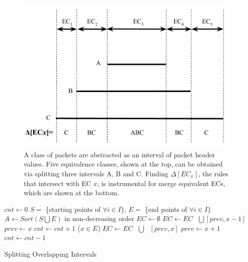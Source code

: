 \begin{figure}[t]
\centering
\includegraphics[scale=.52]{figures/DisjointECs.pdf}
\caption{A class of packets are abstracted as an interval of packet header values.
        Five equivalence classes, shown at the top, can be obtained via splitting three intervals A, B and C.
        Finding $\Delta[EC_x]$, the rules that intersect with EC $x$, is instrumental for
        merge equivalent ECs, which are shown at the bottom.}
\label{Fig:DisjointECsAsInterval}
\end{figure}

\begin{algorithm}[t]
\DontPrintSemicolon
{}
$cnt \gets 0$\;
$S = $ \{starting points of $\forall i \in I\}$, $E = $ \{end points of $\forall i \in I\}$\;
$A \gets Sort(S \bigcup E)$ in non-decreasing order\;
$EC \gets \emptyset$\;
 {
         {
                 {\label{Alg:LineEndStart1} 
                        $EC \gets EC \text{ }\bigcup \text{} [prev, x-1]$\;
                }\label{Alg:LineEndStart2} 
                $prev \gets x$\;\label{Alg:LineNewPrev1}
                $cnt \gets cnt + 1$\;
        }
        \Else ($x \in E$) {
                $EC \gets EC \text{ } \bigcup \text{ } [prev, x]$\;\label{Alg:LineEndEnd}
                $prev \gets x + 1$\;\label{Alg:LineNewPrev2}
                $cnt \gets cnt - 1$\;
        }
}
\caption{Splitting Overlapping Intervals}
\label{Alg:GenDisjointECs}
\end{algorithm}


